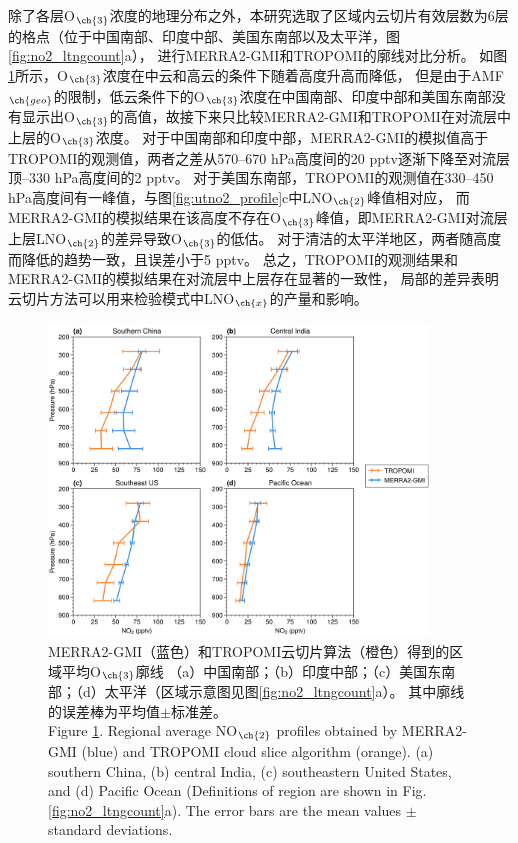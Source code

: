 除了各层O$_{\ch{3}}$浓度的地理分布之外，本研究选取了区域内云切片有效层数为6层的格点（位于中国南部、印度中部、美国东南部以及太平洋，图\ref{fig:no2_ltngcount}a），
进行MERRA2-GMI和TROPOMI的廓线对比分析。
如图\ref{fig:uto3_profile}所示，O$_{\ch{3}}$浓度在中云和高云的条件下随着高度升高而降低，
但是由于AMF$_{\ch{geo}}$的限制，低云条件下的O$_{\ch{3}}$浓度在中国南部、印度中部和美国东南部没有显示出O$_{\ch{3}}$的高值，故接下来只比较MERRA2-GMI和TROPOMI在对流层中上层的O$_{\ch{3}}$浓度。
对于中国南部和印度中部，MERRA2-GMI的模拟值高于TROPOMI的观测值，两者之差从570--670 hPa高度间的20 pptv逐渐下降至对流层顶--330 hPa高度间的2 pptv。
对于美国东南部，TROPOMI的观测值在330--450 hPa高度间有一峰值，与图\ref{fig:utno2_profile}c中LNO$_{\ch{2}}$峰值相对应，
而MERRA2-GMI的模拟结果在该高度不存在O$_{\ch{3}}$峰值，即MERRA2-GMI对流层上层LNO$_{\ch{2}}$的差异导致O$_{\ch{3}}$的低估。
对于清洁的太平洋地区，两者随高度而降低的趋势一致，且误差小于5 pptv。
总之，TROPOMI的观测结果和MERRA2-GMI的模拟结果在对流层中上层存在显著的一致性，
局部的差异表明云切片方法可以用来检验模式中LNO$_{\ch{x}}$的产量和影响。


\begin{figure}[H]
    \centering
    \includegraphics[width=0.9\textwidth]{./figures/uto3_profile.png}
    \caption{
    MERRA2-GMI（蓝色）和TROPOMI云切片算法（橙色）得到的区域平均O$_{\ch{3}}$廓线
    （a）中国南部；（b）印度中部；（c）美国东南部；（d）太平洋（区域示意图见图\ref{fig:no2_ltngcount}a）。
    其中廓线的误差棒为平均值$\pm$标准差。\\
    Figure \ref{fig:uto3_profile}. Regional average NO$_{\ch{2}}$ profiles obtained by MERRA2-GMI (blue) and TROPOMI cloud slice algorithm (orange).
    (a) southern China, (b) central India, (c) southeastern United States, and (d) Pacific Ocean
    (Definitions of region are shown in Fig. \ref{fig:no2_ltngcount}a).
    The error bars are the mean values $\pm$ standard deviations.
    }
    \label{fig:uto3_profile}
\end{figure}


